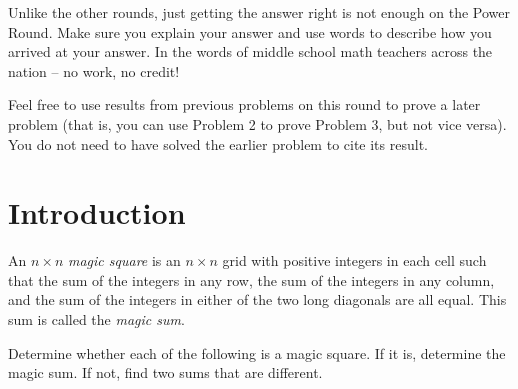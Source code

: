 \documentclass[11pt]{article}
\renewenvironment{problem}{\begin{problems}}{\end{problems}\vspace{5pt}}
\begin{document}
\setlength{\parindent}{0pt}

Unlike the other rounds, just getting the answer right is not enough on the Power Round. 
Make sure you explain your answer and use words to describe how you arrived at your answer. 
In the words of middle school math teachers across the nation -- no work, no credit! \newline

Feel free to use results from previous problems on this round to prove a later problem 
(that is, you can use Problem 2 to prove Problem 3, but not vice versa). 
You do not need to have solved the earlier problem to cite its result.

\section{Introduction}

\begin{definition}
An $n \times n$ \textit{magic square} is an $n \times n$ grid with positive integers in each cell such that
the sum of the integers in any row, the sum of the integers in any column, and the sum of the integers
in either of the two long diagonals are all equal. This sum is called the \textit{magic sum}.
\end{definition}

\begin{problem}[3=1+1+1 points]
Determine whether each of the following is a magic square. If it is, determine the magic sum. If not, find two sums that are different.

\begin{figure}[H]
\centering
{}
\qquad \qquad
{}
\qquad \qquad
{}
\end{figure}
\end{problem}
\end{document}
